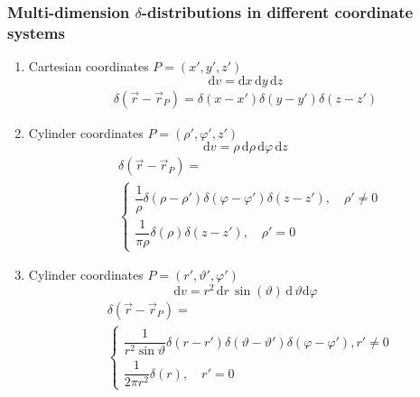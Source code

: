 \subsubsection{Multi-dimension $\delta$-distributions in different coordinate systems}
\begin{enumerate}
\item Cartesian coordinates $P=(x',y',z')$
        \begin{equation*}
          \mathrm{d}v = \mathrm{d}x\,\mathrm{d}y\,\mathrm{d}z
        \end{equation*}
        \begin{align*}
          \delta(\vec{r}-\vec{r}_{P}) = \delta(x-x')\delta(y-y')\delta(z-z')
        \end{align*}
\item Cylinder coordinates $P=(\rho',\varphi',z')$
        \begin{equation*}
          \mathrm{d}v = \rho\,\mathrm{d}\rho\,\mathrm{d}\varphi\,\mathrm{d}z
        \end{equation*}
        \begin{align*}
          &\delta(\vec{r}-\vec{r}_{P}) =\\
          &\begin{cases}
            \dfrac{1}{\rho}\delta(\rho-\rho')\delta(\varphi-\varphi')\delta(z-z'), \quad \rho'\neq0\\
            \dfrac{1}{\pi\rho}\delta(\rho)\delta(z-z'), \quad \rho'=0
          \end{cases}
        \end{align*}
\item Cylinder coordinates $P=(r',\vartheta',\varphi')$
        \begin{equation*}
          \mathrm{d}v = r^{2}\,\mathrm{d}r\,\sin(\vartheta)\,\mathrm{d}\,\vartheta\mathrm{d}\varphi
        \end{equation*}
        \begin{align*}
          &\delta(\vec{r}-\vec{r}_{P}) =\\
          &\begin{cases}
            \dfrac{1}{r^{2}\sin\vartheta}\delta(r-r')\delta(\vartheta-\vartheta')\delta(\varphi-\varphi'),r'\neq0\\
            \dfrac{1}{2\pi r^{2}}\delta(r), \quad r'=0
          \end{cases}
        \end{align*}
\end{enumerate}


